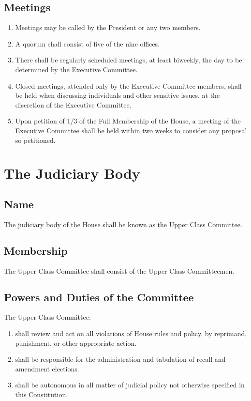 \documentclass[10pt]{article} %
\begin{document}
\subsection{Meetings}
\begin{enumerate}
\item Meetings may be called by the President or any two members.
\item A quorum shall consist of five of the nine offices.
\item There shall be regularly scheduled meetings, at least biweekly, the day to be determined by the Executive Committee.
\item Closed meetings, attended only by the Executive Committee members, shall be held when discussing individuals and other sensitive issues, at the discretion of the Executive Committee.
\item Upon petition of 1/3 of the Full Membership of the House, a meeting of the Executive Committee shall be held within two weeks to consider any proposal so petitioned.
\end{enumerate}
\section{The Judiciary Body}
\subsection{Name}
The judiciary body of the House shall be known as the Upper Class Committee.
\subsection{Membership}
The Upper Class Committee shall consist of the Upper Class Committeemen.
\subsection{Powers and Duties of the Committee}
The Upper Class Committee:
\begin{enumerate}
\item shall review and act on all violations of House rules and policy, by reprimand, punishment, or other appropriate action.
\item shall be responsible for the administration and tabulation of recall and amendment elections.
\item shall be autonomous in all matter of judicial policy not otherwise specified in this Constitution.
\end{enumerate}
\end{document}

